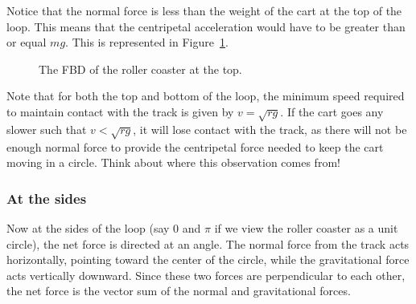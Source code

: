 Notice that the normal force is less than the weight of the cart at the top of the loop. This means that the centripetal acceleration would have to be greater than or equal $mg$. This is represented in Figure~\ref{fig:roller_top}.

\begin{figure}[H]
  \centering
  \caption{The FBD of the roller coaster at the top.}
  \label{fig:roller_top}
\end{figure}

Note that for both the top and bottom of the loop, the minimum speed required to maintain contact with the track is given by $v = \sqrt{rg}$. If the cart goes any slower such that $v < \sqrt{rg}$, it will lose contact with the track, as there will not be enough normal force to provide the centripetal force needed to keep the cart moving in a circle. Think about where this observation comes from!

\subsubsection{At the sides}
Now at the sides of the loop (say $0$ and $\pi$ if we view the roller coaster as a unit circle), the net force is directed at an angle. The normal force from the track acts horizontally, pointing toward the center of the circle, while the gravitational force acts vertically downward. Since these two forces are perpendicular to each other, the net force is the vector sum of the normal and gravitational forces.

